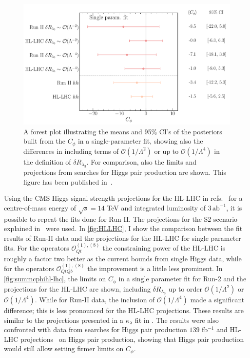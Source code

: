 	\begin{figure}
		\begin{center}
			\includegraphics[width=0.75\linewidth]{fig/uebeblick_forest_cphi_singleparam}
		\end{center}
		\caption{A forest plot illustrating the means and 95\% CI's of the posteriors built from the  $C_\phi$  in a single-parameter fit, showing also the differences in including terms of $\mathcal{O}(1/\Lambda^2)$ or up to $\mathcal{O}(1/\Lambda^4)$ in the definition of $\delta R_{\lambda_3}$. For comparison, also the limits and projections from searches for Higgs pair production are shown. This figure has been published in~\cite{Alasfar:2022zyr}.  \label{fig:summcphihl-lhc}  }
	\end{figure}
\par 	Using the CMS Higgs signal strength projections for the HL-LHC in refs.~\cite{CMS-PAS-FTR-18-011,twiki} for a centre-of-mass energy of $\sqrt{s}=14$ TeV and integrated luminosity of $ 3\, \mathrm{ab}^{-1}$, it is possible to repeat the fits done for Run-II.   The projections for the S2 scenario explained in~\cite{Cepeda:2019klc} were used. 
	In \autoref{fig:HLLHC}, I show the comparison between the fit results of Run-II data and the projections for the HL-LHC for single parameter fits. For the operators $\mathcal{O}_{Qt}^{(1),(8)}$ the constraining power of the HL-LHC is roughly a factor two better as the current bounds from single Higgs data, while for the operators $\mathcal{O}_{QtQb}^{(1),(8)}$ the improvement is a little less prominent.
	 In \autoref{fig:summcphihl-lhc}, the limits on $C_{\phi}$ in a single parameter fit for Run-2 and the projections for the HL-LHC are shown,
	including  $\delta R_{\lambda_3}$ up to order $\mathcal{O}(1/\Lambda^2)$ or $\mathcal{O}(1/\Lambda^4)$. While for Run-II data, the inclusion of $\mathcal{O}(1/\Lambda^4)$ made a significant difference; this is less pronounced for the HL-LHC projections. These results are similar to the projections presented in a $\kappa_{\lambda}$ fit in \cite{DiMicco:2019ngk}. The results were also confronted with data from searches for Higgs pair production $139$ fb$^{-1}$ \cite{ATLAS:2021jki}  and HL-LHC projections~\cite{CMS:2018ccd} on Higgs pair production, showing that Higgs pair production would still allow setting firmer limits on $C_{\phi}$. 
